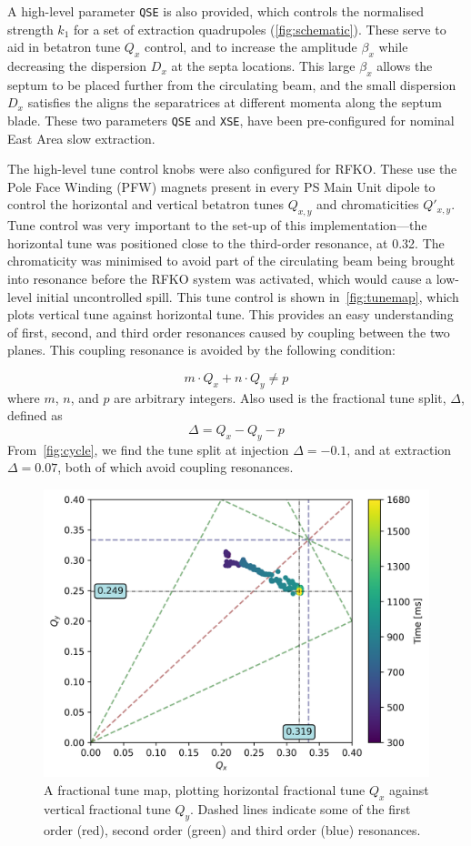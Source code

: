 \documentclass[11pt]{report}
\begin{document}
A high-level parameter \verb|QSE| is also provided, which controls the normalised strength $k_1$ for a set of extraction quadrupoles (\autoref{fig:schematic}). These serve to aid in betatron tune $Q_x$ control, and to increase the amplitude $\beta_x$ while decreasing the dispersion $D_x$ at the septa locations. This large $\beta_x$ allows the septum to be placed further from the circulating beam, and the small dispersion $D_x$ satisfies the aligns the separatrices at different momenta along the septum blade. These two parameters \verb|QSE| and \verb|XSE|, have been pre-configured for nominal East Area slow extraction. 

The high-level tune control knobs were also configured for RFKO. These use the Pole Face Winding (PFW) magnets present in every PS Main Unit dipole to control the horizontal and vertical betatron tunes $Q_{x, y}$ and chromaticities $Q'_{x, y}$. Tune control was very important to the set-up of this implementation---the horizontal tune was positioned close to the third-order resonance, at 0.32. The chromaticity was minimised to avoid part of the circulating beam being brought into resonance before the RFKO system was activated, which would cause a low-level initial uncontrolled spill. This tune control is shown in~\autoref{fig:tunemap}, which plots vertical tune against horizontal tune. This provides an easy understanding of first, second, and third order resonances caused by coupling between the two planes. This coupling resonance is avoided by the following condition:

\begin{equation}
  m\cdot Q_x+n\cdot Q_y\neq p
\end{equation} where $m$, $n$, and $p$ are arbitrary integers. Also used is the fractional tune split, $\Delta$, defined as
\begin{equation}
  \Delta = Q_x-Q_y-p
\end{equation}
From~\autoref{fig:cycle}, we find the tune split at injection $\Delta=-0.1$, and at extraction $\Delta=0.07$, both of which avoid coupling resonances.

\begin{figure}
  \centering
  \includegraphics[width=0.6\linewidth]{tunemap.png}
  \caption{A fractional tune map, plotting horizontal fractional tune $Q_x$ against vertical fractional tune $Q_y$. Dashed lines indicate some of the first order (red), second order (green) and third order (blue) resonances.}\label{fig:tunemap}
\end{figure}
\end{document}
